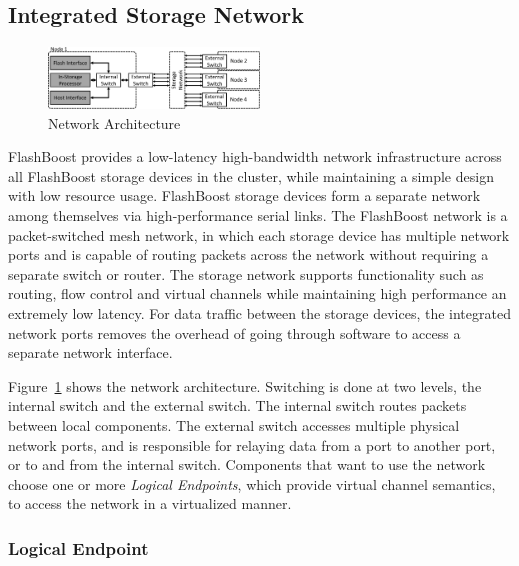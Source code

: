 \subsection{Integrated Storage Network}

\begin{figure}[h]
	\begin{center}
	\includegraphics[width=0.5\textwidth]{figures/network-architecture-crop.pdf}
	\caption{Network Architecture}
	\label{fig:networkinterface}
	\end{center}
\end{figure}


FlashBoost provides a low-latency high-bandwidth network infrastructure across
all FlashBoost storage devices in the cluster, while maintaining a simple design
with low resource usage. FlashBoost storage devices form
a separate network among themselves via high-performance serial links.  The
FlashBoost network is a packet-switched mesh network, in which each storage device has multiple
network ports and is capable of routing packets across the network without
requiring a separate switch or router.  The storage network supports
functionality such as routing, flow control and virtual channels while
maintaining high performance an extremely low latency.  For data traffic between
the storage devices, the integrated network ports removes the overhead of going
through software to access a separate network interface.

Figure~\ref{fig:networkinterface} shows the network architecture. Switching is
done at two levels, the internal switch and the external switch.  The internal
switch routes packets between local components.  The external switch accesses
multiple physical network ports, and is responsible for relaying data from a
port to another port, or to and from the internal switch.
Components that want to use the network choose one or more \emph{Logical
Endpoints}, which provide virtual channel semantics, to access the network in a
virtualized manner.


\subsubsection{Logical Endpoint}

